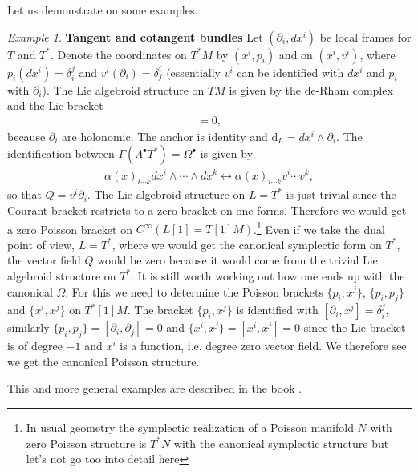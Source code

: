 \documentclass{article}
\def\w{\wedge}
\newcommand{\p}{\partial}
\newcommand{\rd}{\mathrm{d}}
\newcommand{\se}{\Gamma}
\theoremstyle{definition}
\theoremstyle{definition}
\theoremstyle{remark}
\newtheorem{Ex}[theorem]{Example}
\theoremstyle{ref}
\begin{document}
Let us demonstrate on some examples.
\begin{Ex}{\bf Tangent and cotangent bundles}
Let $(\p_i,dx^i)$ be local frames for $T$ and $T^*$. Denote the coordinates on $T^*M$ by $(x^i,p_i)$ and on $(x^i,v^i)$, where $p_i(dx^i)=\delta_i^j$ and $v^i(\p_i)=\delta^i_j$ (essentially $v^i$ can be identified with $dx^i$ and $p_i$ with $\p_i$). The Lie algebroid structure on $TM$ is given by the de-Rham complex and the Lie bracket
\begin{align*}
[\p_i,\p_j]=0,
\end{align*}
because $\p_i$ are holonomic. The anchor is identity and $\rd_L=dx^i\w \p_i$. The identification between $\se(\Lambda^\bullet T^*)=\Omega^\bullet$ is given by
\begin{align*}
\alpha(x)_{i\cdots k}dx^i\w \cdots\w dx^k \longleftrightarrow \alpha(x)_{i\cdots k} v^i\cdots v^k,
\end{align*}
so that $Q=v^i\p_i$. The Lie algebroid structure on $L=T^*$ is just trivial since the Courant bracket restricts to a zero bracket on one-forms. Therefore we would get a zero Poisson bracket on $C^\infty(L[1]=T[1]M)$.\footnote{In usual geometry the symplectic realization of a Poisson manifold $N$ with zero Poisson structure is $T^*N$ with the canonical symplectic structure but let's not go too into detail here} Even if we take the dual point of view, $L=T^*$, where we would get the canonical symplectic form on $T^*$, the vector field $Q$ would be zero because it would come from the trivial Lie algebroid structure on $T^*$. It is still worth working out how one ends up with the canonical $\Omega$. For this we need to determine the Poisson brackets $\{p_i,x^j\}$, $\{p_i,p_j\}$ and $\{x^i,x^j\}$ on $T^*[1]M$. The bracket $\{p_i,x^j\}$ is identified with $[\p_i,x^j]=\delta_i^j$, similarly $\{p_i,p_j\}=[\p_i,\p_j]=0$ and $\{x^i,x^j\}=[x^i,x^j]=0$ since the Lie bracket is of degree $-1$ and $x^i$ is a function, i.e. degree zero vector field. We therefore see we get the canonical Poisson structure.

This and more general examples are described in the book \cite[pg.~119]{weinsteingeomodels}.
\end{Ex}
\end{document}
